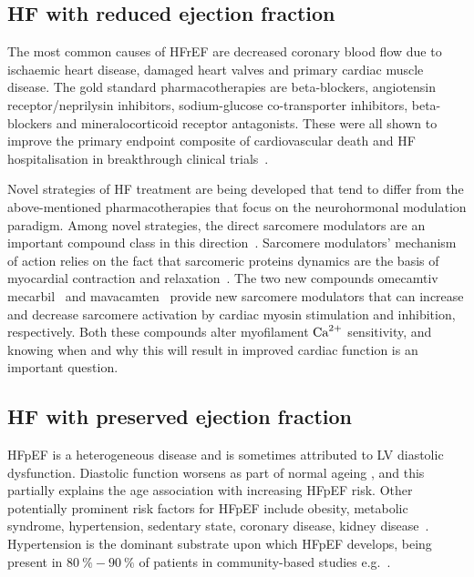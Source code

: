 %
%
%
\subsection{HF with reduced ejection fraction}\label{sec:ch1HF_with_reduced_ejection_fraction}
The most common causes of HFrEF are decreased coronary blood flow due to ischaemic heart disease, damaged heart valves and primary cardiac muscle disease. The gold standard pharmacotherapies are beta-blockers, angiotensin receptor/neprilysin inhibitors, sodium-glucose co-transporter inhibitors, beta-blockers and mineralocorticoid receptor antagonists. These were all shown to improve the primary endpoint composite of cardiovascular death and HF hospitalisation in breakthrough clinical trials~\cite{Debska-Kozlowska:2021}.

\vspace{0.2cm}
Novel strategies of HF treatment are being developed that tend to differ from the above-mentioned pharmacotherapies that focus on the neurohormonal modulation paradigm. Among novel strategies, the direct sarcomere modulators are an important compound class in this direction~\cite{Tsukamoto:2020}. Sarcomere modulators' mechanism of action relies on the fact that sarcomeric proteins dynamics are the basis of myocardial contraction and relaxation~\cite{Solaro:1998}. The two new compounds omecamtiv mecarbil~\cite{Teerlink:2016} and mavacamten~\cite{Olivotto:2020} provide new sarcomere modulators that can increase and decrease sarcomere activation by cardiac myosin stimulation and inhibition, respectively. Both these compounds alter myofilament $\textrm{Ca}^{2+}$ sensitivity, and knowing when and why this will result in improved cardiac function is an important question.


%
%
%
\subsection{HF with preserved ejection fraction}\label{sec:ch1HF_with_preserved_ejection_fraction}
HFpEF is a heterogeneous disease and is sometimes attributed to LV diastolic dysfunction. Diastolic function worsens as part of normal ageing \cite{Andersen:2014}, and this partially explains the age association with increasing HFpEF risk. Other potentially prominent risk factors for HFpEF include obesity, metabolic syndrome, hypertension, sedentary state, coronary disease, kidney disease~\cite{Pfeffer:2019}. Hypertension is the dominant substrate upon which HFpEF develops, being present in $\SI{80}{\percent}-\SI{90}{\percent}$ of patients in community-based studies e.g.~\cite{Borlaug:2009}.

